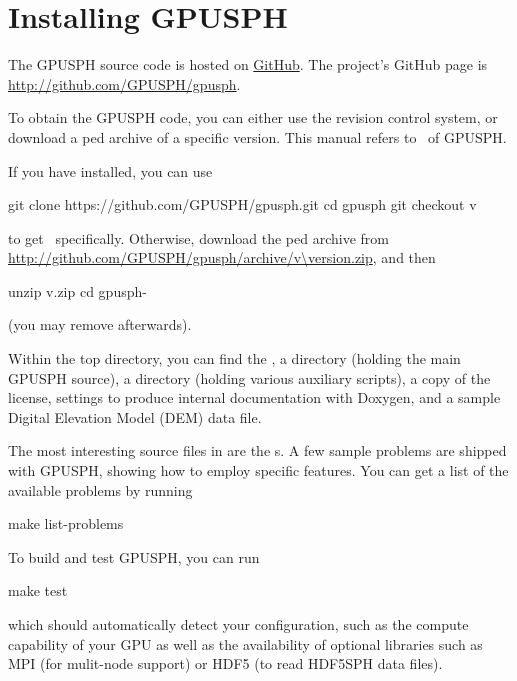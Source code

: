 
\section{Installing GPUSPH}

The GPUSPH source code is hosted on \href{http://github.com}{GitHub}.
The project's GitHub page is \url{http://github.com/GPUSPH/gpusph}.

To obtain the GPUSPH code, you can either use the  revision
control system, or download a ped archive of a specific
version. This manual refers to \currentver\ of GPUSPH.

If you have  installed, you can use
\begin{shellcode}[escapeinside=\{\}]
git clone https://github.com/GPUSPH/gpusph.git
cd gpusph
git checkout v{\version}
\end{shellcode}
to get \currentver\ specifically. Otherwise, download the ped
archive from \url{http://github.com/GPUSPH/gpusph/archive/v\version.zip},
and then
\begin{shellcode}[escapeinside=\{\}]
unzip v{\version}.zip
cd gpusph-{\version}
\end{shellcode}
(you may remove  afterwards).

Within the top directory, you can find the , a 
directory (holding the main GPUSPH source), a  directory
(holding various auxiliary scripts), a copy of the license, settings to
produce internal documentation with Doxygen, and a sample Digital
Elevation Model (DEM) data file.

The most interesting source files in  are the s.
A few sample problems are shipped with GPUSPH, showing how to employ
specific features. You can get a list of the available problems by
running
\begin{shellcode}
make list-problems
\end{shellcode}

To build and test GPUSPH, you can run
\begin{shellcode}
make test
\end{shellcode}
which should automatically detect your configuration, such as the
compute capability of your GPU as well as the availability of optional
libraries such as MPI (for mulit-node support) or HDF5 (to read HDF5SPH
data files).

